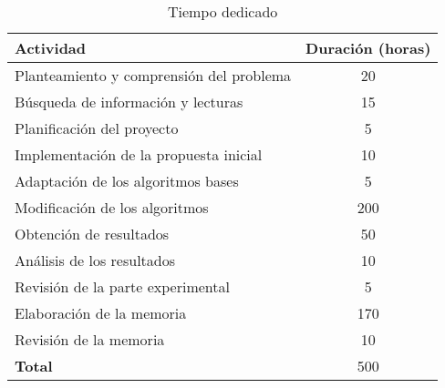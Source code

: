 \begin{table}[H]
\begin{tabular}{|l|c|}
\hline
\rowcolor[HTML]{F7EAC7} 
\textbf{Actividad}                       & \multicolumn{1}{l|}{\cellcolor[HTML]{F7EAC7}\textbf{Duración (horas)}} \\ \hline
\rowcolor[HTML]{ECF4FF} 
Planteamiento y comprensión del problema & 20                                                                     \\ \hline
\rowcolor[HTML]{DDFDFF} 
Búsqueda de información y lecturas       & 15                                                                     \\ \hline
\rowcolor[HTML]{ECF4FF} 
Planificación del proyecto               & 5                                                                      \\ \hline
\rowcolor[HTML]{DDFDFF} 
Implementación de la propuesta inicial   & 10                                                                     \\ \hline
\rowcolor[HTML]{ECF4FF} 
Adaptación de los algoritmos bases       & 5                                                                      \\ \hline
\rowcolor[HTML]{DDFDFF} 
Modificación de los algoritmos           & 200                                                                    \\ \hline
\rowcolor[HTML]{ECF4FF} 
Obtención de resultados                  & 50                                                                     \\ \hline
\rowcolor[HTML]{DDFDFF} 
Análisis de los resultados               & 10                                                                     \\ \hline
\rowcolor[HTML]{ECF4FF} 
Revisión de la parte experimental        & 5                                                                     \\ \hline
\rowcolor[HTML]{DDFDFF} 
Elaboración de la memoria                & 170                                                                    \\ \hline
\rowcolor[HTML]{ECF4FF} 
Revisión de la memoria                   & 10                                                                     \\ \hline
\rowcolor[HTML]{F7EAC7} 
\textbf{Total}                           & \cellcolor[HTML]{FCE6AB}500                                            \\ \hline
\end{tabular}
\caption{\label{Tiempo_Dedicado}Tiempo dedicado}
\end{table}

